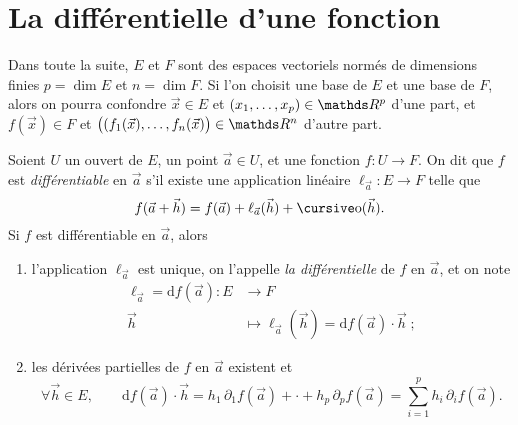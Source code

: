 \section{La différentielle d'une fonction}

Dans toute la suite, $E$ et $F$ sont des espaces vectoriels normés de dimensions finies $p = \dim E$ et $n = \dim F$. Si l'on choisit une base de $E$ et une base de $F$, alors on pourra confondre $\vec{x} \in E$ et $(x_1, \ldots, x_p) \in \R^p$ d'une part, et $f(\vec{x}) \in F$ et $\big((f_1(\vec{x}),\ldots,f_n(\vec{x})\big) \in \R^n$ d'autre part.

\begin{prop-defn}
	Soient $U$ un ouvert de $E$, un point $\vec{a} \in U$, et une fonction $f : U \to F$. On dit que $f$ est \textit{différentiable} en $\vec{a}$ s'il existe une application linéaire $\ell_{\vec{a}} : E \to F$ telle que \[
		f(\vec{a} + \vec{h}) = f(\vec{a}) + \ell_{\vec{a}}(\vec{h}) + \po(\vec{h})
	.\]
	Si $f$ est différentiable en $\vec{a}$, alors
	\begin{enumerate}
		\item l'application $\ell_{\vec{a}}$ est unique, on l'appelle \textit{la différentielle} de $f$ en $\vec{a}$, et on note
			\begin{align*}
				\ell_{\vec{a}} = \mathrm{d}f(\vec{a}): E &\longrightarrow F \\
				\vec{h} &\longmapsto \ell_{\vec{a}}(\vec{h}) = \mathrm{d}f(\vec{a}) \cdot \vec{h} \;;
			\end{align*}
		\item les dérivées partielles de $f$ en $\vec{a}$ existent et \[
				\forall \vec{h} \in E,\quad\quad \mathrm{d}f(\vec{a}) \cdot \vec{h} = h_1\,\partial_1 f(\vec{a}) + \cdot + h_p\, \partial_p f(\vec{a}) = \sum_{i = 1}^p h_i\, \partial_i f(\vec{a})
			.\]
	\end{enumerate}
\end{prop-defn}

